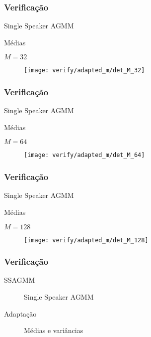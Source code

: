 \begin{frame}
\frametitle{Verificação}
\begin{description}
    \item[SSAGMM] Single Speaker AGMM
    \item[Adaptação] Médias
    \item $M = 32$
\end{description}

\begin{figure}[ht]
    \centering
    \texttt{[image: verify/adapted\_m/det\_M\_32]}
\end{figure}
\end{frame}

\begin{frame}
\frametitle{Verificação}
\begin{description}
    \item[SSAGMM] Single Speaker AGMM
    \item[Adaptação] Médias
    \item $M = 64$
\end{description}

\begin{figure}[ht]
    \centering
    \texttt{[image: verify/adapted\_m/det\_M\_64]}
\end{figure}
\end{frame}

\begin{frame}
\frametitle{Verificação}
\begin{description}
    \item[SSAGMM] Single Speaker AGMM
    \item[Adaptação] Médias
    \item $M = 128$
\end{description}

\begin{figure}[ht]
    \centering
    \texttt{[image: verify/adapted\_m/det\_M\_128]}
\end{figure}
\end{frame}

\begin{frame}
\frametitle{Verificação}
\begin{description}
    \item[SSAGMM] Single Speaker AGMM
    \item[Adaptação] Médias e variâncias
\end{description}


\end{frame}

